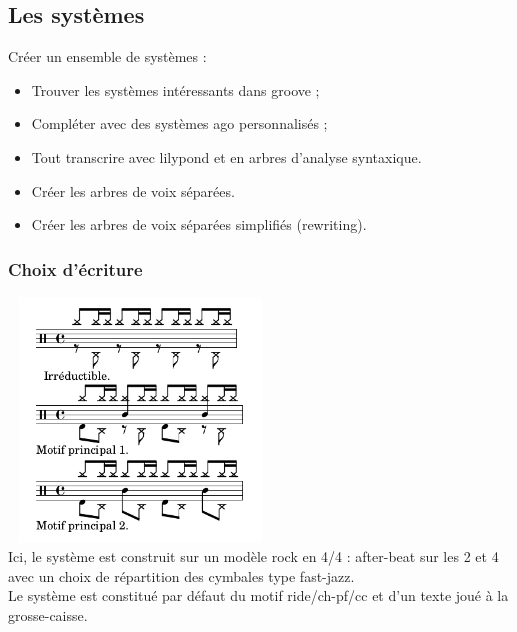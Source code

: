 \subsection{Les systèmes}
Créer un ensemble de systèmes :
\begin{itemize}
\item Trouver les systèmes intéressants dans groove ;
\item Compléter avec des systèmes ago personnalisés ;
\item Tout transcrire avec lilypond et en arbres d’analyse syntaxique.
\item Créer les arbres de voix séparées.
\item Créer les arbres de voix séparées simplifiés (rewriting).\\	
\end{itemize}

\subsubsection{Choix d’écriture}
\includegraphics[height=65mm, width=70mm]{images/description_notation/motif_binaire-fastjazz.png}\\
Ici, le système est construit sur un modèle rock en 4/4 : after-beat sur les 2 et 4 avec un choix de répartition des cymbales type fast-jazz.\\
Le système est constitué par défaut du motif ride/ch-pf/cc et d’un texte joué à la grosse-caisse.\\



